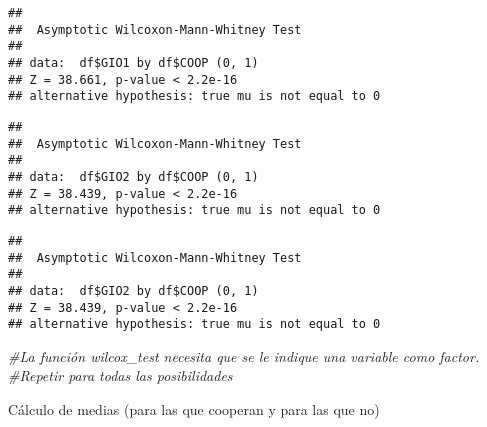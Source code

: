 \documentclass[
]{article}
\newenvironment{Shaded}{\begin{snugshade}}{\end{snugshade}}
\newcommand{\CommentTok}[1]{\textcolor[rgb]{0.56,0.35,0.01}{\textit{#1}}}
\newcommand{\FloatTok}[1]{\textcolor[rgb]{0.00,0.00,0.81}{#1}}
\newcommand{\KeywordTok}[1]{\textcolor[rgb]{0.13,0.29,0.53}{\textbf{#1}}}
\newcommand{\NormalTok}[1]{#1}
\newcommand{\OperatorTok}[1]{\textcolor[rgb]{0.81,0.36,0.00}{\textbf{#1}}}
\newcommand{\StringTok}[1]{\textcolor[rgb]{0.31,0.60,0.02}{#1}}
\begin{document}
\begin{verbatim}
## 
##  Asymptotic Wilcoxon-Mann-Whitney Test
## 
## data:  df$GIO1 by df$COOP (0, 1)
## Z = 38.661, p-value < 2.2e-16
## alternative hypothesis: true mu is not equal to 0
\end{verbatim}

\begin{Shaded}
\end{Shaded}

\begin{verbatim}
## 
##  Asymptotic Wilcoxon-Mann-Whitney Test
## 
## data:  df$GIO2 by df$COOP (0, 1)
## Z = 38.439, p-value < 2.2e-16
## alternative hypothesis: true mu is not equal to 0
\end{verbatim}

\begin{Shaded}
\end{Shaded}

\begin{verbatim}
## 
##  Asymptotic Wilcoxon-Mann-Whitney Test
## 
## data:  df$GIO2 by df$COOP (0, 1)
## Z = 38.439, p-value < 2.2e-16
## alternative hypothesis: true mu is not equal to 0
\end{verbatim}

\begin{Shaded}
\begin{Highlighting}[]
\CommentTok{#La función wilcox_test necesita que se le indique una variable como factor.}
\CommentTok{#Repetir para todas las posibilidades}
\end{Highlighting}
\end{Shaded}

Cálculo de medias (para las que cooperan y para las que no)

\begin{Shaded}
\end{Shaded}
\end{document}
